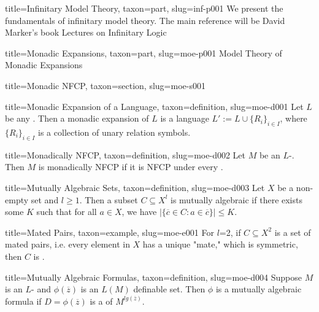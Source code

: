 \documentclass[a4paper]{article}
\begin{document}
  
  
\begin{tree}{title={Infinitary Model Theory}, taxon={part}, slug={inf-p001}}
We present the fundamentals of infinitary model theory. The main reference will be David Marker's book Lectures on Infinitary Logic
\end{tree}


  
  
\begin{tree}{title={Monadic Expansions}, taxon={part}, slug={moe-p001}}
Model Theory of Monadic Expansions
  
  
\begin{tree}{title={Monadic NFCP}, taxon={section}, slug={moe-s001}}

\begin{tree}{title={Monadic Expansion of a Language}, taxon={definition}, slug={moe-d001}}
Let \(L\) be any . Then a monadic expansion of \(L\) is a language \(L':= L \cup \{ R_i \} _{i \in  I}\), where \(\{ R_i \} _{i \in  I}\) is a collection of unary relation symbols.
\end{tree}

\begin{tree}{title={Monadically NFCP}, taxon={definition}, slug={moe-d002}}
Let \(M\) be an \(L\)-. Then \(M\) is monadically NFCP if it is NFCP under every .
\end{tree}

\begin{tree}{title={Mutually Algebraic Sets}, taxon={definition}, slug={moe-d003}}
Let \(X\) be a non-empty set and \(l \geq1\). Then a subset \(C \subseteq  X^l\) is mutually algebraic if there exists some \(K\) such that for all \(a \in  X\), we have \(| \{ \overline {c} \in  C: a \in \overline {c} \} | \leq  K\).
\end{tree}

\begin{tree}{title={Mated Pairs}, taxon={example}, slug={moe-e001}}
For \(l\)=2, if \(C \subseteq  X^2\) is a set of mated pairs, i.e. every element in \(X\) has a unique "mate," which is symmetric, then \(C\) is .
\end{tree}

\begin{tree}{title={Mutually Algebraic Formulas}, taxon={definition}, slug={moe-d004}}
Suppose \(M\) is an \(L\)- and \(\phi ( \overline {z})\) is an \(L(M)\) definable set. Then \(\phi\) is a mutually algebraic formula if \(D= \phi ( \overline {z})\) is a  of \(M^{lg( \overline {z})}\).
\end{tree}

\end{tree}


\end{tree}


\printbibliography
\end{document}
